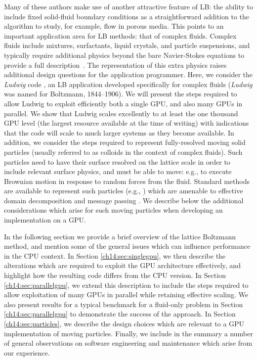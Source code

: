 Many of these authors make use of
another attractive feature of LB: the ability to include fixed
solid-fluid boundary conditions as a straightforward addition to
the algorithm to study, for example, flow in
porous media. This points to an important
application area for LB methods: that of complex fluids.
Complex fluids include mixtures, surfactants, liquid crystals,
and particle suspensions, and typically require additional physics
beyond the bare Navier-Stokes equations to provide a full
description~\cite{aidun2010}. The representation of this extra
physics raises additional design questions for the application
programmer. Here, we consider the \textit{Ludwig} code \cite{desplat},
an LB application developed specifically for complex fluids
(\textit{Ludwig} was named for Boltzmann, 1844--1906).
We will present the steps
required to allow Ludwig to exploit efficiently both a single
GPU, and also many GPUs in parallel.  We show that
Ludwig scales excellently to at least the one thousand GPU level
(the largest resource available at the time of writing) with
indications that the code will scale to much larger systems as
they become available. In addition, we consider the steps required
to represent fully-resolved moving solid particles (usually referred
to as colloids in the context of complex fluids). Such particles
need to have their surface resolved on the lattice scale in order
to include relevant surface physics, and must be able to move: e.g.,
to execute Brownian motion in response to random forces from the
fluid. Standard methods are available to represent such particles
(e.g., \cite{ladd1994,nguyen2002}) which are amenable to effective
domain decomposition and message passing \cite{stratford2008}.
We describe below the additional considerations which arise
for such moving particles when developing an
implementation on a GPU.

In the following section we provide a brief overview of the lattice
Boltzmann method, and mention some of the general issues which can
influence performance in the CPU context.
In Section \ref{ch14:sec:singlegpu}, we then describe the alterations
which are required to exploit the GPU architecture effectively, and
highlight how the resulting code differs from the CPU version. In
Section \ref{ch14:sec:parallelgpu}, we extend this description to
include the steps required to allow exploitation of many GPUs in
parallel while retaining effective scaling. We also present results for
a typical benchmark for a fluid-only problem in Section
\ref{ch14:sec:parallelgpu} to demonstrate the success of the approach.
In Section \ref{ch14:sec:particles}, we describe the design choices
which are relevant to a GPU implementation of moving particles. Finally,
we include in the summary a number of general observations on software
engineering and maintenance which arise from our experience.


